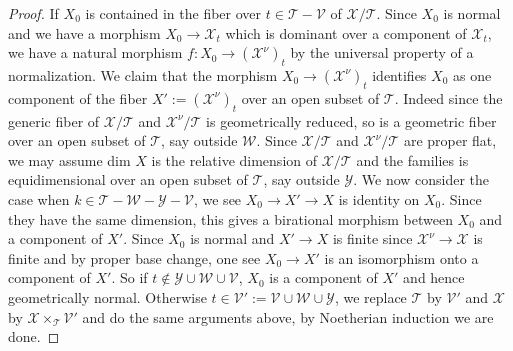\documentclass[letterpaper,reqno,12pt]{amsart}
\numberwithin{equation}{section}
\theoremstyle{plain}
\begin{document}
\begin{proof}
    If $X_0$ is contained in the fiber over $t\in\mathcal T-\mathcal V$ of $\mathcal X/\mathcal T$. Since $X_0$ is normal and we have a morphism $X_0\to\mathcal X_t$ which is dominant over a component of $\mathcal X_t$, we have a natural morphism $f:X_0\to(\mathcal X^{\nu})_t$ by the universal property of a normalization. We claim that the morphism $X_0\to(\mathcal X^\nu)_t$ identifies $X_0$ as one component of the fiber $X':=(\mathcal X^\nu)_t$ over an open subset of $\mathcal T$. Indeed since the generic fiber of $\mathcal X/\mathcal T$ and $\mathcal X^\nu/\mathcal T$ is geometrically reduced, so is a geometric fiber over an open subset of $\mathcal T$, say outside $\mathcal W$. Since $\mathcal X/\mathcal T$ and $\mathcal X^\nu/\mathcal T$ are proper flat, we may assume dim $X$ is the relative dimension of $\mathcal X/\mathcal T$ and the families is equidimensional over an open subset of $\mathcal T$, say outside $\mathcal Y$. We now consider the case when $k\in\mathcal T-\mathcal W-\mathcal Y-\mathcal V$, we see $X_0\to X'\to X$ is identity on $X_0$. Since they have the same dimension, this gives a birational morphism between $X_0$ and a component of $X'$. Since $X_0$ is normal and $X'\to X$ is finite since $\mathcal X^\nu\to\mathcal X$ is finite and by proper base change, one see $X_0\to X'$ is an isomorphism onto a component of $X'$. So if $t\notin \mathcal Y\cup\mathcal W\cup\mathcal V$, $X_0$ is a component of $X'$ and hence geometrically normal. Otherwise $t\in\mathcal V':=\mathcal V\cup\mathcal W\cup\mathcal Y$, we replace $\mathcal T$ by $\mathcal V'$ and $\mathcal X$ by $\mathcal X\times_{\mathcal T}\mathcal V'$ and do the same arguments above, by Noetherian induction we are done.
\end{proof}
\end{document}
